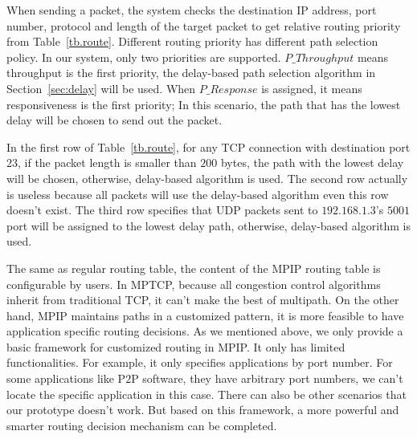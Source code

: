 When sending a packet, the system checks the destination IP address, port number, protocol and length of the target packet to get relative routing priority from Table~\ref{tb.route}. Different routing priority has different path selection policy. In our system, only two priorities are supported. $P\_Throughput$ means throughput is the first priority, the delay-based path selection algorithm in Section~\ref{sec:delay} will be used. When $P\_Response$ is assigned, it means responsiveness is the first priority; In this scenario, the path that has the lowest delay will be chosen to send out the packet.

In the first row of Table~\ref{tb.route}, for any TCP connection with destination port $23$, if the packet length is smaller than $200$ bytes, the path with the lowest delay will be chosen, otherwise, delay-based algorithm is used. The second row actually is useless because all packets will use the delay-based algorithm even this row doesn't exist. The third row specifies that UDP packets sent to $192.168.1.3$'s $5001$ port will be assigned to the lowest delay path, otherwise, delay-based algorithm is used.

The same as regular routing table, the content of the MPIP routing table is configurable by users. In MPTCP, because all congestion control algorithms inherit from traditional TCP, it can't make the best of multipath. On the other hand, MPIP maintains paths in a customized pattern, it is more feasible to have application specific routing decisions. As we mentioned above, we only provide a basic framework for customized routing in MPIP. It only has limited functionalities. For example, it only  specifies applications by port number. For some applications like P$2$P software, they have arbitrary port numbers, we can't locate the specific application in this case. There can also be other scenarios that our prototype doesn't work. But based on this framework, a more powerful and smarter routing decision mechanism can be completed.

